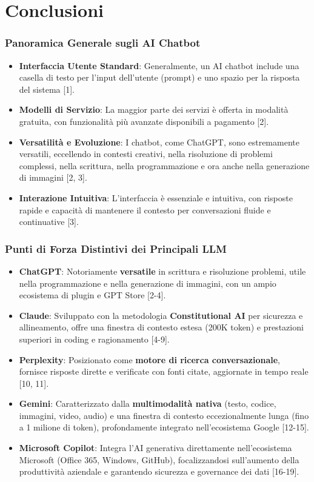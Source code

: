 \documentclass[aspectratio=169]{beamer}
\begin{document}
\section{Conclusioni}
%
%
\begin{frame}
    \frametitle{Panoramica Generale sugli AI Chatbot}
    \begin{itemize}
        \item \textbf{Interfaccia Utente Standard}: Generalmente, un AI chatbot include una casella di testo per l'input dell'utente (prompt) e uno spazio per la risposta del sistema [1].
        \item \textbf{Modelli di Servizio}: La maggior parte dei servizi è offerta in modalità gratuita, con funzionalità più avanzate disponibili a pagamento [2].
        \item \textbf{Versatilità e Evoluzione}: I chatbot, come ChatGPT, sono estremamente versatili, eccellendo in contesti creativi, nella risoluzione di problemi complessi, nella scrittura, nella programmazione e ora anche nella generazione di immagini [2, 3].
        \item \textbf{Interazione Intuitiva}: L'interfaccia è essenziale e intuitiva, con risposte rapide e capacità di mantenere il contesto per conversazioni fluide e continuative [3].
    \end{itemize}
\end{frame}
%
%
\begin{frame}
    \frametitle{Punti di Forza Distintivi dei Principali LLM}
    \begin{itemize}
    \small
        \item \textbf{ChatGPT}: Notoriamente \textbf{versatile} in scrittura e risoluzione problemi, utile nella programmazione e nella generazione di immagini, con un ampio ecosistema di plugin e GPT Store [2-4].
        \item \textbf{Claude}: Sviluppato con la metodologia \textbf{Constitutional AI} per sicurezza e allineamento, offre una finestra di contesto estesa (200K token) e prestazioni superiori in coding e ragionamento [4-9].
        \item \textbf{Perplexity}: Posizionato come \textbf{motore di ricerca conversazionale}, fornisce risposte dirette e verificate con fonti citate, aggiornate in tempo reale [10, 11].
        \item \textbf{Gemini}: Caratterizzato dalla \textbf{multimodalità nativa} (testo, codice, immagini, video, audio) e una finestra di contesto eccezionalmente lunga (fino a 1 milione di token), profondamente integrato nell'ecosistema Google [12-15].
        \item \textbf{Microsoft Copilot}: Integra l'AI generativa direttamente nell'ecosistema Microsoft (Office 365, Windows, GitHub), focalizzandosi sull'aumento della produttività aziendale e garantendo sicurezza e governance dei dati [16-19].
    \end{itemize}
\end{frame}
\end{document}
